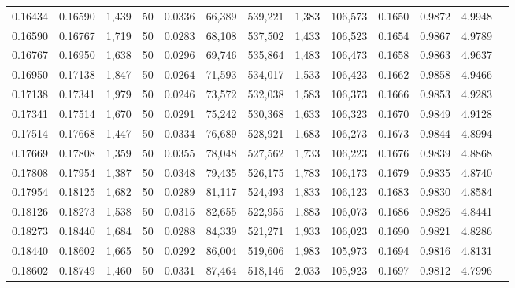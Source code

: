 \begin{tabular}{rrrrrrrrrrrrr}
0.16434 & 0.16590 & 1,439 &  50 &                                     0.0336 &  66,389 & 539,221 &   1,383 & 106,573 & 0.1650 & 0.9872 & 4.9948 \\
0.16590 & 0.16767 & 1,719 &  50 &                                     0.0283 &  68,108 & 537,502 &   1,433 & 106,523 & 0.1654 & 0.9867 & 4.9789 \\
0.16767 & 0.16950 & 1,638 &  50 &                                     0.0296 &  69,746 & 535,864 &   1,483 & 106,473 & 0.1658 & 0.9863 & 4.9637 \\
0.16950 & 0.17138 & 1,847 &  50 &                                     0.0264 &  71,593 & 534,017 &   1,533 & 106,423 & 0.1662 & 0.9858 & 4.9466 \\
0.17138 & 0.17341 & 1,979 &  50 &                                     0.0246 &  73,572 & 532,038 &   1,583 & 106,373 & 0.1666 & 0.9853 & 4.9283 \\
0.17341 & 0.17514 & 1,670 &  50 &                                     0.0291 &  75,242 & 530,368 &   1,633 & 106,323 & 0.1670 & 0.9849 & 4.9128 \\
0.17514 & 0.17668 & 1,447 &  50 &                                     0.0334 &  76,689 & 528,921 &   1,683 & 106,273 & 0.1673 & 0.9844 & 4.8994 \\
0.17669 & 0.17808 & 1,359 &  50 &                                     0.0355 &  78,048 & 527,562 &   1,733 & 106,223 & 0.1676 & 0.9839 & 4.8868 \\
0.17808 & 0.17954 & 1,387 &  50 &                                     0.0348 &  79,435 & 526,175 &   1,783 & 106,173 & 0.1679 & 0.9835 & 4.8740 \\
0.17954 & 0.18125 & 1,682 &  50 &                                     0.0289 &  81,117 & 524,493 &   1,833 & 106,123 & 0.1683 & 0.9830 & 4.8584 \\
0.18126 & 0.18273 & 1,538 &  50 &                                     0.0315 &  82,655 & 522,955 &   1,883 & 106,073 & 0.1686 & 0.9826 & 4.8441 \\
0.18273 & 0.18440 & 1,684 &  50 &                                     0.0288 &  84,339 & 521,271 &   1,933 & 106,023 & 0.1690 & 0.9821 & 4.8286 \\
0.18440 & 0.18602 & 1,665 &  50 &                                     0.0292 &  86,004 & 519,606 &   1,983 & 105,973 & 0.1694 & 0.9816 & 4.8131 \\
0.18602 & 0.18749 & 1,460 &  50 &                                     0.0331 &  87,464 & 518,146 &   2,033 & 105,923 & 0.1697 & 0.9812 & 4.7996 \\

\end{tabular}
